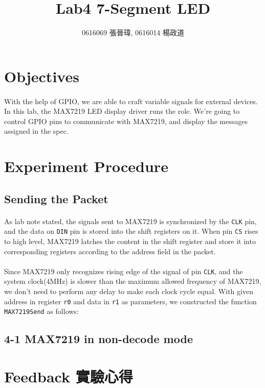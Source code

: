 \title{Lab4 7-Segment LED}
\author{0616069 張晉瑋, 0616014 楊政道}
\maketitle
\thispagestyle{fancy}
\section{Objectives}
\paragraph{}
With the help of GPIO, we are able to craft variable signals for external devices.
In this lab, the MAX7219 LED display driver runs the role.
We're going to control GPIO pins to communicate with MAX7219, and display the messages assigned in the spec.

\section{Experiment Procedure}
\subsection{Sending the Packet}
\paragraph{}
As lab note stated, the signals sent to MAX7219 is synchronized by the \texttt{CLK} pin, 
and the data on \texttt{DIN} pin is stored into the shift registers on it.
When pin \texttt{CS} rises to high level, MAX7219 latches the content in the shift register and store it into corresponding registers according to the address field in the packet.
\paragraph{}
Since MAX7219 only recognizes rising edge of the signal of pin \texttt{CLK},
and the system clock(4MHz) is slower than the maximum allowed frequency of MAX7219,
we don't need to perform any delay to make each clock cycle equal.
With given address in register \texttt{r0} and data in \texttt{r1} as parameters,
we constructed the function \texttt{MAX7219Send} as follows:
\begin{listlst}

\end{listlst}
\subsection{4-1 MAX7219 in non-decode mode}
\paragraph{}
\section{Feedback 實驗心得}
\paragraph{}
